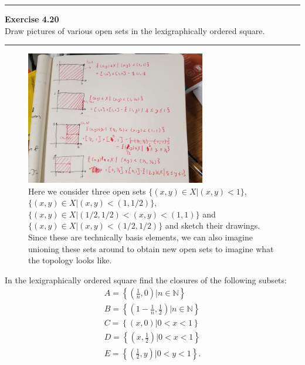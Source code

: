 \documentclass[a4paper,12pt,twoside]{hmcpset}
\begin{document}
\noindent\rule{18cm}{1pt}
\textbf{Exercise 4.20}\\
Draw pictures of various open sets in the lexigraphically ordered
square. 
\\\noindent\rule{18cm}{1pt}
\begin{figure}[h]
    \centering
    \includegraphics[width = 0.7\textwidth]{figures_theorems_sect_4/exercise_4_20.jpg}
    \caption{Here we consider three open sets $\{(x,y) \in X | (x, y)
    < 1\}$, $\{(x,y) \in X | (x, y) < (1, 1/2)\}$, $\{(x,y) \in X |
    (1/2, 1/2) < (x, y) <(1, 1) \}$ and $\{(x,y) \in X | (x, y) <
    (1/2, 1/2)\}$ and sketch their drawings. Since these are
    technically basis elements, we can also imagine unioning these
    sets around to obtain new open sets to imagine what the topology
    looks like.}
\end{figure}

\newpage
\begin{exercise}[4.21]
    In the lexigraphically ordered square find the closures of the
following subsets:
\begin{gather*}
    A = \left\{ \left(\frac{1}{n}, 0\right) | n \in \mathbb{N}\right\}\\
    B = \left\{ \left(1 - \frac{1}{n}, \frac{1}{2}\right) | n \in \mathbb{N}\right\}\\
    C = \left\{ \left(x,0\right) | 0 < x < 1 \right\}\\
    D = \left\{ \left(x, \frac{1}{2}\right) | 0 < x < 1\right\}\\
    E = \left\{ \left(\frac{1}{2}, y \right) | 0 < y < 1\right\}.
\end{gather*}
\end{exercise}
\end{document}
